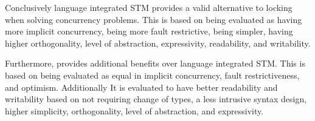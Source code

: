 Conclusively language integrated \ac{STM} provides a valid alternative to locking when solving concurrency problems. This is based on being evaluated as having more implicit concurrency, being more fault restrictive, being simpler, having higher orthogonality, level of abstraction, expressivity, readability, and writability.

Furthermore, \stmname provides additional benefits over language integrated \ac{STM}. This is based on being evaluated as equal in implicit concurrency, fault restrictiveness, and optimism. Additionally It is evaluated to have better readability and writability based on not requiring change of types, a less intrusive syntax design, higher simplicity, orthogonality, level of abstraction, and expressivity.

\worksheetend